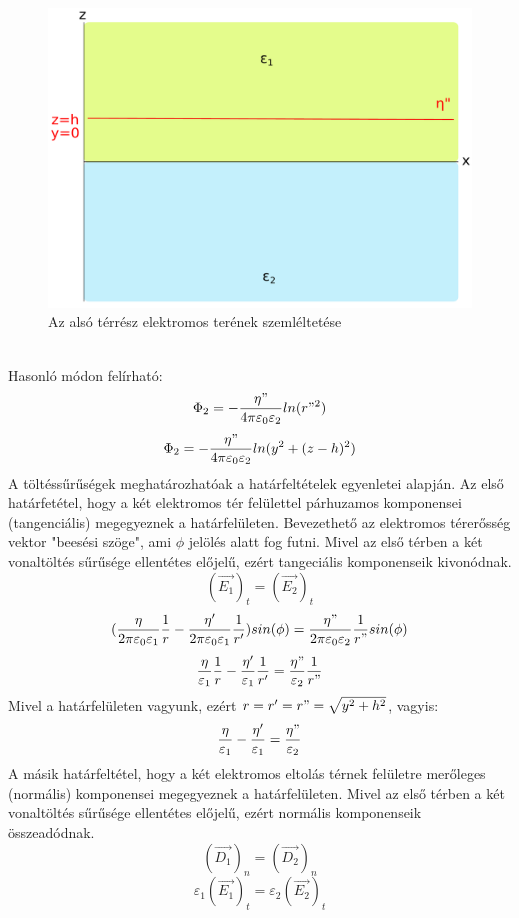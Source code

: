\documentclass[11pt,a4paper,openany,leqno]{article}
\begin{document}
\begin{figure}[h!]
\centering
  \includegraphics[width=120mm,scale=0.5]{beadando1_2.pdf}
  \caption{Az alsó térrész elektromos terének szemléltetése}
  \label{}
\end{figure} \\ \indent
\indent
Hasonló módon felírható:
$$ \Phi_2 = -\frac{\eta"}{4 \pi \varepsilon_0 \varepsilon_2} ln(r"^2) $$
$$ \Phi_2 = -\frac{\eta"}{4 \pi \varepsilon_0 \varepsilon_2} ln(y^2 + (z-h)^2) $$
\indent
A töltéssűrűségek meghatározhatóak a határfeltételek egyenletei alapján. Az első határfetétel, hogy a két elektromos tér felülettel párhuzamos komponensei (tangenciális) megegyeznek a határfelületen. Bevezethető az elektromos térerősség vektor "beesési szöge", ami $\phi$ jelölés alatt fog futni. Mivel az első térben a két vonaltöltés sűrűsége ellentétes előjelű, ezért tangeciális komponenseik kivonódnak.
$$ (\vec{E_1})_t = (\vec{E_2})_t $$
$$ (\frac{\eta}{2 \pi \varepsilon_0 \varepsilon_1} \frac{1}{r} - \frac{\eta'}{2 \pi \varepsilon_0 \varepsilon_1} \frac{1}{r'}) sin(\phi) = \frac{\eta"}{2 \pi \varepsilon_0 \varepsilon_2} \frac{1}{r"} sin(\phi)$$
$$ \frac{\eta}{\varepsilon_1} \frac{1}{r} - \frac{\eta'}{\varepsilon_1} \frac{1}{r'} = \frac{\eta"}{\varepsilon_2} \frac{1}{r"}$$
\indent
Mivel a határfelületen vagyunk, ezért $r = r' = r" = \sqrt{y^2 + h^2}$, vagyis:
$$ \frac{\eta}{\varepsilon_1} - \frac{\eta'}{\varepsilon_1} = \frac{\eta"}{\varepsilon_2}$$
\indent
A másik határfeltétel, hogy a két elektromos eltolás térnek felületre merőleges (normális) komponensei megegyeznek a határfelületen. Mivel az első térben a két vonaltöltés sűrűsége ellentétes előjelű, ezért normális komponenseik összeadódnak.
$$ (\vec{D_1})_n = (\vec{D_2})_n $$
$$ \varepsilon_1 (\vec{E_1})_t = \varepsilon_2 (\vec{E_2})_t $$
\end{document}
